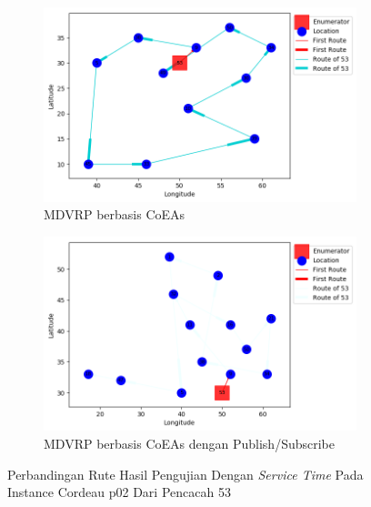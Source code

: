 \begin{figure}[H]
	\centering
	\begin{subfigure}[t]{\textwidth}
		\centering
		\includegraphics[width=\textwidth]{Resources/Images/cordeau_p02_tw/cordeau_p02_tw_53_coes}
		\caption{MDVRP berbasis CoEAs}
		\label{fig:cordeau_p02_tw_53_coes}
	\end{subfigure}
	\begin{subfigure}[t]{\textwidth}
		\centering
		\includegraphics[width=\textwidth]{Resources/Images/cordeau_p02_tw/cordeau_p02_tw_53_pubsub_coes}
		\caption{MDVRP berbasis CoEAs dengan Publish/Subscribe}
		\label{fig:cordeau_p02_tw_53_pubsub_coes}
	\end{subfigure}
	\caption{Perbandingan Rute Hasil Pengujian Dengan \textit{Service Time} Pada Instance Cordeau p02 Dari Pencacah 53}
	\label{fig:cordeau_p02_tw_53}
\end{figure}


